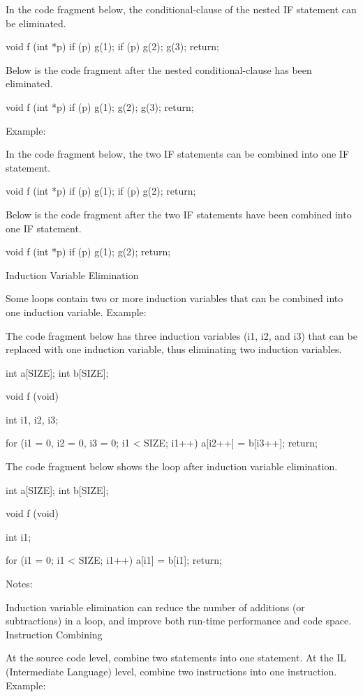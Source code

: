 {{{{{{{{{{In the code fragment below, the conditional-clause of the nested IF statement can be eliminated.

    void f (int *p)
    {
      if (p)
        {
          g(1);
          if (p) g(2);
          g(3);
        }
      return;
    }

Below is the code fragment after the nested conditional-clause has been eliminated.

    void f (int *p)
    {
      if (p)
        {
          g(1);
          g(2);
          g(3);
        }
      return;
    }

Example:

In the code fragment below, the two IF statements can be combined into one IF statement.

    void f (int *p)
    {
      if (p) g(1);
      if (p) g(2);
      return;
    }

Below is the code fragment after the two IF statements have been combined into one IF statement.

    void f (int *p)
    {
      if (p)
        {
          g(1);
          g(2);
        }
      return;
    }

Induction Variable Elimination

Some loops contain two or more induction variables that can be combined into one induction variable.
Example:

The code fragment below has three induction variables (i1, i2, and i3) that can be replaced with one induction variable, thus eliminating two induction variables.

    int a[SIZE];
    int b[SIZE];

    void f (void)
    {
      int i1, i2, i3;

      for (i1 = 0, i2 = 0, i3 = 0; i1 < SIZE; i1++)
        a[i2++] = b[i3++];
      return;
    }

The code fragment below shows the loop after induction variable elimination.

    int a[SIZE];
    int b[SIZE];

    void f (void)
    {
      int i1;

      for (i1 = 0; i1 < SIZE; i1++)
        a[i1] = b[i1];
      return;
    }

Notes:

Induction variable elimination can reduce the number of additions (or subtractions) in a loop, and improve both run-time performance and code space. 
Instruction Combining

At the source code level, combine two statements into one statement. At the IL (Intermediate Language) level, combine two instructions into one instruction.
Example:

}}}}}}}}}}
